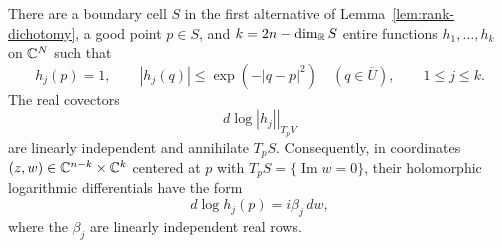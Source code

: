 \begin{proposition}
\label{prop:supported-point}
There are a boundary cell $S$ in the first alternative of
Lemma~\ref{lem:rank-dichotomy}, a good point $p\in S$, and
$k=2n-\dim_{\mathbb R}S$ entire functions $h_1,\ldots,h_k$ on $\mathbb C^N$
such that
\begin{equation}
 h_j(p)=1,\qquad
 |h_j(q)|\leq\exp(-|q-p|^2)\quad(q\in\overline U),
 \qquad 1\leq j\leq k.
 \label{eq:peak}
\end{equation}
The real covectors
\[
 \left.d\log|h_j|\right|_{T_pV}
\]
are linearly independent and annihilate $T_pS$.  Consequently, in
coordinates $(z,w)\in\mathbb C^{n-k}\times\mathbb C^k$ centered at $p$ with
$T_pS=\{\operatorname{Im}w=0\}$, their holomorphic logarithmic
differentials have the form
\[
 d\log h_j(p)=i\beta_j\,dw,
\]
where the $\beta_j$ are linearly independent real rows.
\end{proposition}


